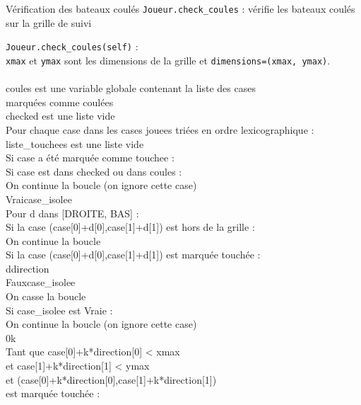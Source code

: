 \begin{frame}{Vérification des bateaux coulés}
\texttt{Joueur.check\_coules} : vérifie les bateaux coulés sur la grille de suivi
\end{frame}


{
\begin{frame}[allowframebreaks]
\texttt{Joueur.check\_coules(self)} :\\
\texttt{xmax} et \texttt{ymax} sont les dimensions de la grille et \texttt{dimensions=(xmax, ymax)}.\\~\\
coules est une variable globale contenant la liste des cases\\
 marquées comme coulées\\
checked est une liste vide\\
Pour chaque case dans les cases jouees triées en ordre lexicographique :\\
liste\_touchees est une liste vide\\
Si case a été marquée comme touchee :\\
Si case est dans checked ou dans coules :\\
On continue la boucle (on ignore cette case)\\
Vrai\sto case\_isolee\\
\framebreak
{}Pour d dans [DROITE, BAS] :\\
Si la case (case[0]+d[0],case[1]+d[1]) est hors de la grille :\\
On continue la boucle\\
Si la case (case[0]+d[0],case[1]+d[1]) est marquée touchée :\\
d\sto direction\\
Faux\sto case\_isolee\\
On casse la boucle\\
Si case\_isolee est Vraie :\\
On continue la boucle (on ignore cette case)\\
\framebreak
{}0\sto k\\
Tant que case[0]+k*direction[0] < xmax\\
et case[1]+k*direction[1] < ymax\\
et (case[0]+k*direction[0],case[1]+k*direction[1])\\
 est marquée touchée :\\

\end{frame}}
